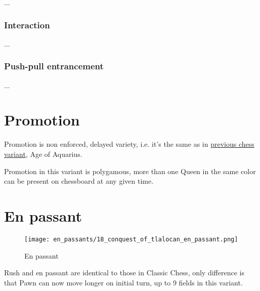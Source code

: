 ...

\clearpage %

\subsubsection*{Interaction}

...

\clearpage %

\subsubsection*{Push-pull entrancement}

...




\clearpage %

\section*{Promotion}

Promotion is non enforced, delayed variety, i.e. it's the same as in
\hyperref[sec:Age of Aquarius/Promotion]{previous chess variant}, Age of Aquarius.

Promotion in this variant is polygamous, more than one Queen in the same color
can be present on chessboard at any given time.

\clearpage %

\section*{En passant}

\noindent
\begin{wrapfigure}{l}{0.4\textwidth}
\centering
\texttt{[image: en\_passants/18\_conquest\_of\_tlalocan\_en\_passant.png]}
\caption{En passant}
\label{fig:18_conquest_of_tlalocan_en_passant}
\end{wrapfigure}
Rush and en passant are identical to those in Classic Chess, only difference
is that Pawn can now move longer on initial turn, up to 9 fields in this
variant.

